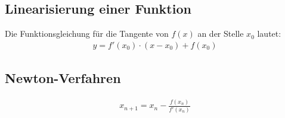 \subsection{Linearisierung einer Funktion}
Die Funktionsgleichung für die Tangente von $f(x)$ an der Stelle $x_0$ lautet:
\begin{align*}
    y = f'(x_0) \cdot (x - x_0) + f(x_0)
\end{align*}
\subsection{Newton-Verfahren}
\begin{align*}
    x_{n+1} = x_n - \frac{f(x_n)}{f'(x_n)}
\end{align*}